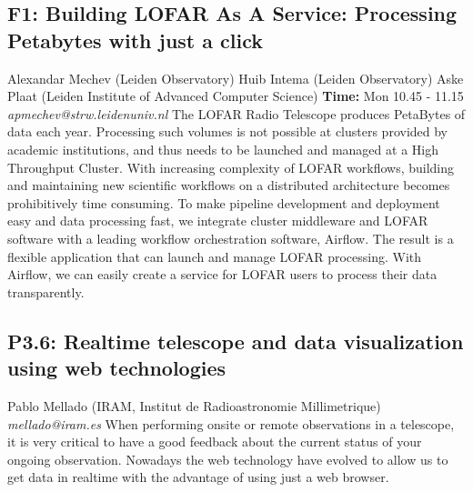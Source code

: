\documentclass{report}
\begin{document}
\subsection*{F1: Building LOFAR As A Service: Processing Petabytes with just a click}
\bigskip
Alexandar Mechev (Leiden Observatory) \newline Huib Intema (Leiden Observatory) \newline  Aske Plaat (Leiden Institute of Advanced Computer Science)\newline   \newline  \newline  \newline\newline
{\bf Time:} Mon 10.45 - 11.15\newline
\newline
{\it apmechev@strw.leidenuniv.nl}\newline
\newline\newline
The LOFAR Radio Telescope produces PetaBytes of data each year. Processing such volumes is not possible at clusters provided by academic institutions, and thus needs to be launched and managed at a High Throughput Cluster. With increasing complexity of LOFAR workflows, building and maintaining new scientific workflows on a distributed architecture becomes prohibitively time consuming. To make pipeline development and deployment easy and data processing fast, we integrate cluster middleware and LOFAR software with a leading workflow orchestration software, Airflow. The result is a flexible  application that can launch and manage LOFAR processing. With Airflow, we can easily create a service for LOFAR users to process their data transparently.\newline
\newpage
\subsection*{P3.6: Realtime telescope and data visualization using web technologies}
\bigskip
Pablo Mellado (IRAM, Institut de Radioastronomie Millimetrique) \newline   \newline   \newline   \newline  \newline  \newline\newline
{\it mellado@iram.es}\newline
\newline\newline
When performing onsite or remote observations in a telescope, it is very critical to have a good feedback about the current status of your ongoing observation. Nowadays the web technology have evolved to allow us to get data in realtime with the advantage of using just a web browser.
\end{document}
